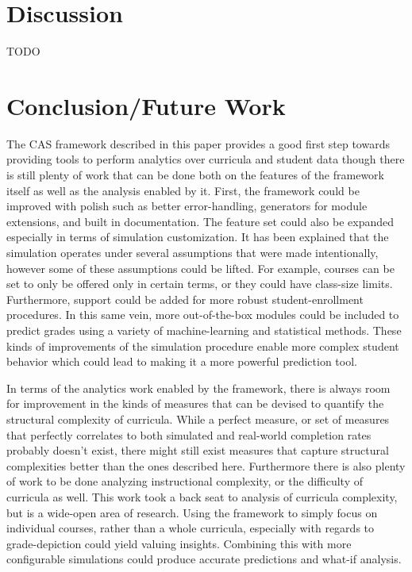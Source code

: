 \documentclass[botnum, fleqn]{unmeethesis}
\begin{document}

\chapter{Discussion}
TODO


\chapter{Conclusion/Future Work}
  The CAS framework described in this paper provides a good first step towards providing tools to perform analytics over curricula and student data though there is still plenty of work that can be done both on the features of the framework itself as well as the analysis enabled by it. First, the framework could be improved with polish such as better error-handling, generators for module extensions, and built in documentation. The feature set could also be expanded especially in terms of simulation customization. It has been explained that the simulation operates under several assumptions that were made intentionally, however some of these assumptions could be lifted. For example, courses can be set to only be offered only in certain terms, or they could have class-size limits. Furthermore, support could be added for more robust student-enrollment procedures. In this same vein, more out-of-the-box modules could be included to predict grades using a variety of machine-learning and statistical methods. These kinds of improvements of the simulation procedure enable more complex student behavior which could lead to making it a more powerful prediction tool.

  In terms of the analytics work enabled by the framework, there is always room for improvement in the kinds of measures that can be devised to quantify the structural complexity of curricula. While a perfect measure, or set of measures that perfectly correlates to both simulated and real-world completion rates probably doesn't exist, there might still exist measures that capture structural complexities better than the ones described here. Furthermore there is also plenty of work to be done analyzing instructional complexity, or the difficulty of curricula as well. This work took a back seat to analysis of curricula complexity, but is a wide-open area of research. Using the framework to simply focus on individual courses, rather than a whole curricula, especially with regards to grade-depiction could yield valuing insights. Combining this with more configurable simulations could produce accurate predictions and what-if analysis.
\end{document}
